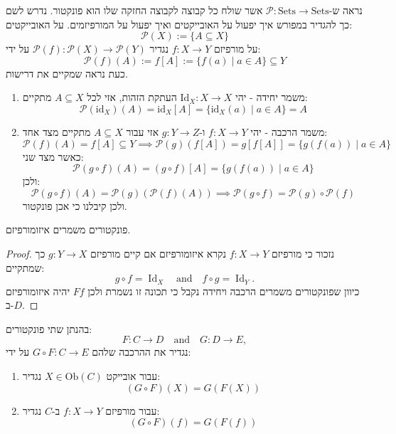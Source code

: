 \documentclass{tstextbook}
\begin{document}
\begin{example}
נראה ש-\(\mathcal{P}:\mathrm{Sets}\to \mathrm{Sets}\) אשר שולח כל קבוצה לקבוצה החזקה שלו הוא פונקטור. נדרש לשם כך להגדיר במפורש איך יפעול על האובייקטים ואיך יפעול על המורפיזמים. על האובייקטים:
$${\mathcal{P}}(X):=\{A\subseteq X\}$$
על מורפיזם \(f:X\to Y\) נגדיר \({\mathcal{P}}(f):{\mathcal{P}}(X)\to{\mathcal{P}}(Y)\) על ידי:
$${\mathcal{P}}(f)(A):=f[A]:=\{f(a)\mid a\in A\}\subseteq Y$$
כעת נראה שמקיים את דרישות.

  \begin{enumerate}
    \item משמר יחידה - יהי \(\mathrm{Id}_{X}:X\to X\) העתקת הזהות, אזי לכל \(A\subseteq X\) מתקיים: 
$${\mathcal{P}}({\mathrm{id}}_{X})(A)={\mathrm{id}}_{X}[A]=\{{\mathrm{id}}_{X}(a)\mid a\in A\}=A$$


    \item משמר הרכבה - יהי \(f:X\to Y\) ו-\(g:Y\to Z\) אזי עבור \(A\subseteq X\) מתקיים מצד אחד: 
$${\mathcal{P}}(f)(A)=f[A]\subseteq Y\implies {\mathcal{P}}(g)(f[A])=g[f[A]]=\{g(f(a))\mid a\in A\}$$
כאשר מצד שני:
$${\mathcal{P}}(g\circ f)(A)=(g\circ f)[A]=\{g(f(a))\mid a\in A\}$$
ולכן:
$${\mathcal{P}}\left( g\circ f \right)(A)={\mathcal{P}}(g)\left( {\mathcal{P}}(f)(A) \right)\implies {\mathcal{P}}(g\circ f)={\mathcal{P}}(g)\circ{\mathcal{P}}(f)$$
ולכן קיבלנו כי אכן פונקטור.


  \end{enumerate}
\end{example}
\begin{proposition}
פונקטורים משמרים איזומורפיזם.

\end{proposition}
\begin{proof}
נזכור כי מורפיזם \(f:X\to Y\) נקרא איזומורפיזם אם קיים מורפיזם \(g:Y\to X\) כך שמתקיים:
$$g\circ f=\operatorname{Id}_{X}\quad{\mathrm{and}}\quad f\circ g=\operatorname{Id}_{Y}.$$
כיוון שפונקטורים משמרים הרכבה ויחידה נקבל כי תכונה זו נשמרת ולכן \(Ff\) יהיה איזומורפיזם ב-\(D\).

\end{proof}
\begin{definition}
בהנתן שתי פונקטורים:
$$F:C\to D\quad{\mathrm{and}}\quad G:D\to E,$$
נגדיר את ההרכבה שלהם \(G\circ F:C\to E\) על ידי:

  \begin{enumerate}
    \item עבור אובייקט \(X \in \mathrm{Ob}(C)\) נגדיר: 
$$(G\circ F)(X)=G(F(X))$$


    \item עבור מורפיזם \(f:X\to Y\) ב-\(C\) נגדיר: 
$$(G\circ F)(f)=G(F(f))$$


  \end{enumerate}
\end{definition}
\end{document}

